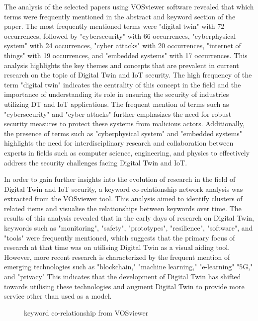 The analysis of the selected papers using VOSviewer software revealed that which terms were frequently mentioned in the abstract and keyword section of the paper. The most frequently mentioned terms were "digital twin" with 72 occurrences, followed by "cybersecurity" with 66 occurrences, "cyberphysical system" with 24 occurrences, "cyber attacks" with 20 occurrences, "internet of things" with 19 occurrences, and "embedded systems" with 17 occurrences. This analysis highlights the key themes and concepts that are prevalent in current research on the topic of Digital Twin and IoT security. The high frequency of the term "digital twin" indicates the centrality of this concept in the field and the importance of understanding its role in ensuring the security of industries utilizing DT and IoT applications. The frequent mention of terms such as "cybersecurity" and "cyber attacks" further emphasizes the need for robust security measures to protect these systems from malicious actors. Additionally, the presence of terms such as "cyberphysical system" and "embedded systems" highlights the need for interdisciplinary research and collaboration between experts in fields such as computer science, engineering, and physics to effectively address the security challenges facing Digital Twin and IoT.

In order to gain further insights into the evolution of research in the field of Digital Twin and IoT security, a keyword co-relationship network analysis was extracted from the VOSviewer tool. This analysis aimed to identify clusters of related items and visualise the relationships between keywords over time. The results of this analysis revealed that in the early days of research on Digital Twin, keywords such as "monitoring", "safety", "prototypes", "resilience", "software", and "tools" were frequently mentioned, which suggests that the primary focus of research at that time was on utilising Digital Twin as a visual aiding tool. However, more recent research is characterized by the frequent mention of emerging technologies such as "blockchain," "machine learning," "e-learning" "5G," and "privacy" This indicates that the development of Digital Twin has shifted towards utilising these technologies and augment Digital Twin to provide more service other than used as a model.



\begin{figure}[H]
    \caption{keyword co-relationship from VOSviewer}
    
    \label{fig:co-occurrence-vosv}
\end{figure}


